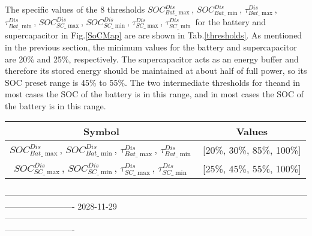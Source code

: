 \documentclass[energies,article,submit,moreauthors,pdftex,10pt,a4paper]{Definitions/mdpi}
\begin{document}
The specific values of the 8 thresholds $SOC_{Bat\_\max }^{Dis}$, $SOC_{Bat\_\min }^{Dis}$, $\tau _{Bat\_\max }^{Dis}$, $\tau _{Bat\_\min }^{Dis}$, $SOC_{SC\_\max }^{Dis}$, $SOC_{SC\_\min }^{Dis}$, $\tau _{SC\_\max }^{Dis}$, $\tau _{SC\_\min }^{Dis}$ for the battery and supercapacitor in Fig.\ref{SoCMap} are are shown in Tab.\ref{thresholds}. As mentioned in the previous section, the minimum values for the battery and supercapacitor are 20\% and 25\%, respectively. The supercapacitor acts as an energy buffer and therefore its stored energy should be maintained  at about half of full power, so its SOC preset range is 45\% to 55\%. The two intermediate thresholds for theand in most cases the SOC of the battery is in this range, and in most cases the SOC of the battery is in this range.

\begin{table*}[ht]
\begin{center}
\caption{The threshold values of the SOCs of the battery and the supercapacitor.}\label{thresholds}
\begin{tabular}{cc}
\toprule  %
Symbol & Values\\
\hline
$SOC_{Bat\_\max }^{Dis}$, $SOC_{Bat\_\min }^{Dis}$, $\tau _{Bat\_\max }^{Dis}$, $\tau _{Bat\_\min }^{Dis}$&   [20\%, 30\%, 85\%, 100\%] \\
  $SOC_{SC\_\max }^{Dis}$, $SOC_{SC\_\min }^{Dis}$, $\tau _{SC\_\max }^{Dis}$, $\tau _{SC\_\min }^{Dis}$  & [25\%, 45\%, 55\%, 100\%] \\
\bottomrule %
\end{tabular}
\end{center}
\end{table*}
-------------------------------------------------------------------------------------------------------------------------------------
2028-11-29\\
-------------------------------------------------------------------------------------------------------------------------------------
\end{document}
